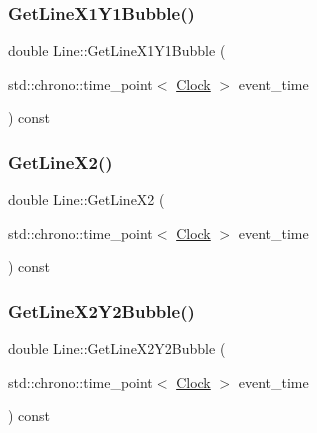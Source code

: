 \mbox{\label{classLine_adc3c6c42d1b3d172e32fad59db2e3eaa}} 
\subsubsection{\texorpdfstring{Get\+Line\+X1\+Y1\+Bubble()}{GetLineX1Y1Bubble()}}
{\footnotesize\ttfamily double Line\+::\+Get\+Line\+X1\+Y1\+Bubble (\begin{DoxyParamCaption}\item[{std\+::chrono\+::time\+\_\+point$<$ \mbox{\hyperlink{universe_8h_a0ef8d951d1ca5ab3cfaf7ab4c7a6fd80}{Clock}} $>$}]{event\+\_\+time }\end{DoxyParamCaption}) const\hspace{0.3cm}{\ttfamily [inline]}}

\mbox{\label{classLine_a9cdf38d7aaeadfa35136dd417865c189}} 
\subsubsection{\texorpdfstring{Get\+Line\+X2()}{GetLineX2()}}
{\footnotesize\ttfamily double Line\+::\+Get\+Line\+X2 (\begin{DoxyParamCaption}\item[{std\+::chrono\+::time\+\_\+point$<$ \mbox{\hyperlink{universe_8h_a0ef8d951d1ca5ab3cfaf7ab4c7a6fd80}{Clock}} $>$}]{event\+\_\+time }\end{DoxyParamCaption}) const\hspace{0.3cm}{\ttfamily [inline]}}

\mbox{\label{classLine_a2432406f734963e4497541081a843131}} 
\subsubsection{\texorpdfstring{Get\+Line\+X2\+Y2\+Bubble()}{GetLineX2Y2Bubble()}}
{\footnotesize\ttfamily double Line\+::\+Get\+Line\+X2\+Y2\+Bubble (\begin{DoxyParamCaption}\item[{std\+::chrono\+::time\+\_\+point$<$ \mbox{\hyperlink{universe_8h_a0ef8d951d1ca5ab3cfaf7ab4c7a6fd80}{Clock}} $>$}]{event\+\_\+time }\end{DoxyParamCaption}) const\hspace{0.3cm}{\ttfamily [inline]}}

